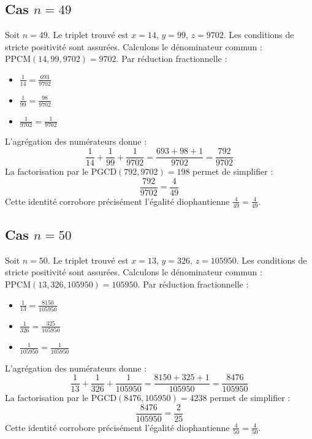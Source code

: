 \documentclass[11pt,a4paper]{article}
\begin{document}
\subsection{Cas $n = 49$}
Soit $n = 49$. Le triplet trouvé est $x = 14$, $y = 99$, $z = 9702$.
Les conditions de stricte positivité sont assurées.
Calculons le dénominateur commun : $\text{PPCM}(14, 99, 9702) = 9702$.
Par réduction fractionnelle :
\begin{itemize}
    \item $\frac{1}{14} = \frac{693}{9702}$
    \item $\frac{1}{99} = \frac{98}{9702}$
    \item $\frac{1}{9702} = \frac{1}{9702}$
\end{itemize}
L'agrégation des numérateurs donne :
$$ \frac{1}{14} + \frac{1}{99} + \frac{1}{9702} = \frac{693 + 98 + 1}{9702} = \frac{792}{9702} $$
La factorisation par le $\text{PGCD}(792, 9702) = 198$ permet de simplifier :
$$ \frac{792}{9702} = \frac{4}{49} $$
Cette identité corrobore précisément l'égalité diophantienne $\frac{4}{49} = \frac{4}{49}$.

\subsection{Cas $n = 50$}
Soit $n = 50$. Le triplet trouvé est $x = 13$, $y = 326$, $z = 105950$.
Les conditions de stricte positivité sont assurées.
Calculons le dénominateur commun : $\text{PPCM}(13, 326, 105950) = 105950$.
Par réduction fractionnelle :
\begin{itemize}
    \item $\frac{1}{13} = \frac{8150}{105950}$
    \item $\frac{1}{326} = \frac{325}{105950}$
    \item $\frac{1}{105950} = \frac{1}{105950}$
\end{itemize}
L'agrégation des numérateurs donne :
$$ \frac{1}{13} + \frac{1}{326} + \frac{1}{105950} = \frac{8150 + 325 + 1}{105950} = \frac{8476}{105950} $$
La factorisation par le $\text{PGCD}(8476, 105950) = 4238$ permet de simplifier :
$$ \frac{8476}{105950} = \frac{2}{25} $$
Cette identité corrobore précisément l'égalité diophantienne $\frac{4}{50} = \frac{4}{50}$.
\end{document}
